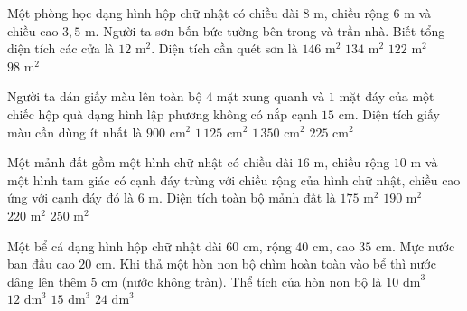 \begin{ex} %
Một phòng học dạng hình hộp chữ nhật có chiều dài $8\text{ m}$, chiều rộng $6\text{ m}$ và chiều cao $3{,}5\text{ m}$. Người ta sơn bốn bức tường bên trong và trần nhà. Biết tổng diện tích các cửa là $12\text{ m}^2$. Diện tích cần quét sơn là
\choice
{$146\text{ m}^2$}
{\True $134\text{ m}^2$}
{$122\text{ m}^2$}
{$98\text{ m}^2$}
\end{ex}

\begin{ex} %
Người ta dán giấy màu lên toàn bộ $4$ mặt xung quanh và $1$ mặt đáy của một chiếc hộp quà dạng hình lập phương không có nắp cạnh $15\text{ cm}$. Diện tích giấy màu cần dùng ít nhất là
\choice
{$900\text{ cm}^2$}
{\True $1\,125\text{ cm}^2$}
{$1\,350\text{ cm}^2$}
{$225\text{ cm}^2$}
\end{ex}

\begin{ex} %
Một mảnh đất gồm một hình chữ nhật có chiều dài $16\text{ m}$, chiều rộng $10\text{ m}$ và một hình tam giác có cạnh đáy trùng với chiều rộng của hình chữ nhật, chiều cao ứng với cạnh đáy đó là $6\text{ m}$. Diện tích toàn bộ mảnh đất là
\choice
{$175\text{ m}^2$}
{\True $190\text{ m}^2$}
{$220\text{ m}^2$}
{$250\text{ m}^2$}
\end{ex}

\begin{ex} %
Một bể cá dạng hình hộp chữ nhật dài $60\text{ cm}$, rộng $40\text{ cm}$, cao $35\text{ cm}$. Mực nước ban đầu cao $20\text{ cm}$. Khi thả một hòn non bộ chìm hoàn toàn vào bể thì nước dâng lên thêm $5\text{ cm}$ (nước không tràn). Thể tích của hòn non bộ là
\choice
{$10\text{ dm}^3$}
{\True $12\text{ dm}^3$}
{$15\text{ dm}^3$}
{$24\text{ dm}^3$}
\end{ex}

